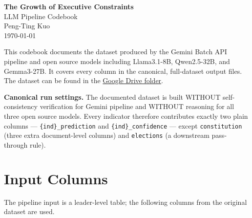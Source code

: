 \documentclass[11pt, a4paper]{article}
\begin{document}

\begin{center}
  {\LARGE\bfseries The Growth of Executive Constraints}\\[0.4cm]
  {\large LLM Pipeline Codebook}\\[0.2cm]
  {Peng-Ting Kuo} \\[0.2cm]
  {\small \today}
\end{center}

\bigskip

This codebook documents the dataset produced by the Gemini Batch API pipeline and open source models including Llama3.1-8B, Qwen2.5-32B, and Gemma3-27B.
It covers every column in the canonical, full-dataset output files. The dataset can be found in the \href{https://drive.google.com/drive/folders/1Y1oUJ41vCwXSeHYVmyZUn2sG8uHMwJx6?usp=sharing}{Google Drive folder}.

\medskip
\textbf{Canonical run settings.} The documented dataset is built WITHOUT
self-consistency verification for Gemini pipeline and WITHOUT reasoning for all three
open source models. Every
indicator therefore contributes exactly two plain columns —
\texttt{\{ind\}\_\allowbreak prediction} and \texttt{\{ind\}\_\allowbreak confidence} —
except \texttt{constitution} (three extra document-level columns) and
\texttt{elections} (a downstream pass-through rule).

\section{Input Columns}

The pipeline input is a leader-level table; the following columns from the original dataset are
used.
\end{document}
